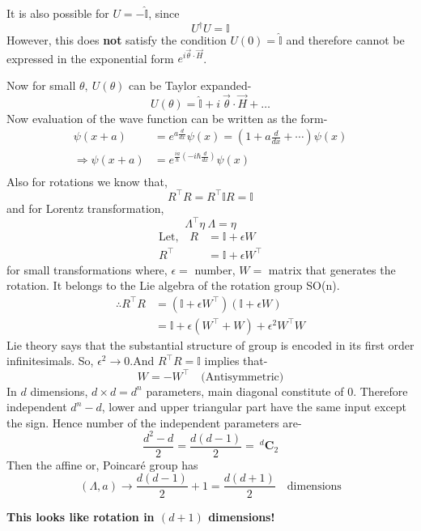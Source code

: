 \documentclass[14pt]{article} %
\begin{document}
\begin{tcolorbox}[ title=\textbf{Note}]
It is also possible for $U = -\hat{\mathbb{I}}$, since
\[
U^\dagger U = \mathbb{I}
\]
However, this does \textbf{not} satisfy the condition $U(0) = \hat{\mathbb{I}}$ and therefore cannot be expressed in the exponential form $e^{ i \vec{\theta}\cdot\vec{H}}$.
\end{tcolorbox}
\noindent
Now for small $\theta,~U(\theta)$ can be Taylor expanded-
\[
U(\theta) = \hat{\mathbb{I}} + i ~\vec{\theta}\cdot \vec{H} + \dots
\]
Now evaluation of the wave function can be written as the form-
\begin{align*}
\psi(x + a) &= e^{a \frac{d}{dx}} \psi(x) = \left(1 + a \frac{d}{dx} + \cdots \right) \psi(x) \\
\Rightarrow \psi(x + a) &= e^{\frac{ia}{\hbar} (-i \hbar \frac{d}{dx})} \psi(x) \\
\end{align*}
Also for rotations we know that,
\[
R^\top R = R^\top \mathbb{I} R = \mathbb{I}
\]
and for Lorentz transformation,
\[
\Lambda^\top \eta~ \Lambda = \eta
\]
\begin{align*}
\text{Let,}\quad R &= \mathbb{I} + \epsilon W \\
R^\top &= \mathbb{I} + \epsilon W^\top
\end{align*}
for small transformations where, $\epsilon =$ number, $W=$ matrix that generates the rotation. It belongs to the Lie algebra of the rotation group SO(n).
\begin{align*}
\therefore R^\top R &= (\mathbb{I} + \epsilon W^\top)(\mathbb{I} + \epsilon W) \\
&= \mathbb{I} + \epsilon(W^\top + W) + \epsilon^2 W^\top W 
\end{align*}
Lie theory says that the substantial structure of group is encoded in its first order infinitesimals. So, $\epsilon^2 \rightarrow0$.And $R^\top R = \mathbb{I}$ implies that-
\[
W = -W^\top \quad \text{(Antisymmetric)}
\]
In $d$ dimensions, $d \times d = d^n$ parameters, main diagonal constitute of 0. Therefore independent $d^n -d$, lower and upper triangular part have the same input except the sign.
Hence number of the independent parameters are-
\[
\frac{d^2 -d }{2} = \frac{d(d-1)}{2} = ~^d\mathbf{C}_2
\]
Then the affine or, Poincaré group has 
\[
(\Lambda,a) \rightarrow \frac{d(d-1)}{2} + 1 = \frac{d(d+1)}{2} \quad \text{dimensions}
\]
\begin{center}
    \textbf{This looks like rotation in $(d + 1)$ dimensions!}
\end{center}
\end{document}
